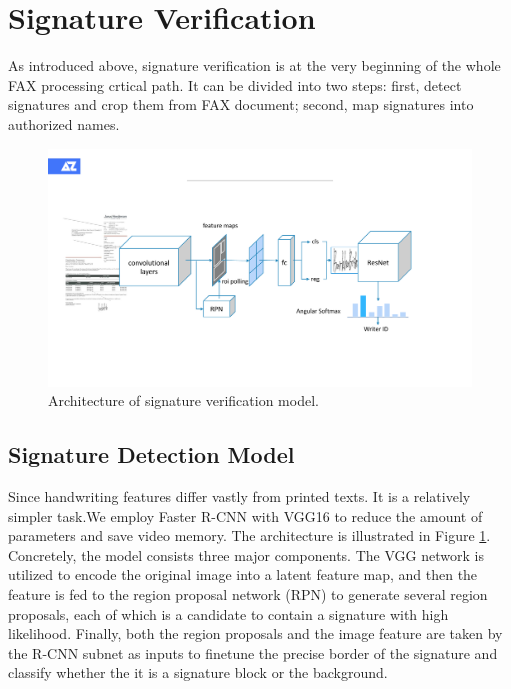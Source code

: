 \documentclass[sigconf]{acmart}
\begin{document}
\section{Signature Verification}

As introduced above, signature verification is at the very beginning of the whole FAX processing crtical path. It can be divided into two steps: first, detect signatures and crop them from FAX document; second, map signatures into authorized names.

\begin{figure}[h]
	\centering
	\includegraphics[width=\linewidth]{figure2}
	\caption{Architecture of signature verification model. }
	\label{figure2}
\end{figure}

\subsection{Signature Detection Model}
Since handwriting features differ vastly from printed texts. It is a relatively simpler task.We employ Faster R-CNN \cite{ren2015faster} with VGG16 \cite{simonyan2014very} to reduce the amount of parameters and save video memory. The architecture is illustrated in Figure \ref{figure2}. Concretely, the model consists three major components. The VGG network is utilized to encode the original image into a latent feature map, and then the feature is fed to the region proposal network (RPN) to generate several region proposals, each of which is a candidate to contain a signature with high likelihood. Finally, both the region proposals and the image feature are taken by the R-CNN subnet as inputs to finetune the precise border of the signature and classify whether the it is a signature block or the background.
\end{document}
